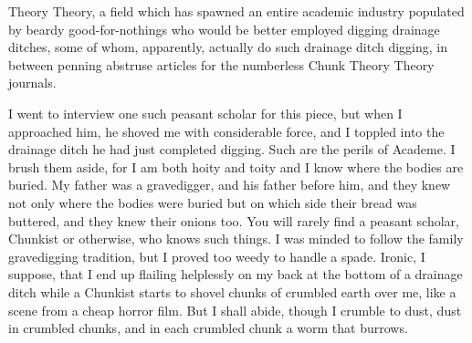 Theory Theory, a field which has spawned an entire academic industry populated by beardy good-for-nothings who would be better employed digging drainage ditches, some of whom, apparently, actually do such drainage ditch digging, in between penning abstruse articles for the numberless Chunk Theory Theory journals.

I went to interview one such peasant scholar for this piece, but when I approached him, he shoved me with considerable force, and I toppled into the drainage ditch he had just completed digging. Such are the perils of Academe. I brush them aside, for I am both hoity and toity and I know where the bodies are buried. My father was a gravedigger, and his father before him, and they knew not only where the bodies were buried but on which side their bread was buttered, and they knew their onions too. You will rarely find a peasant scholar, Chunkist or otherwise, who knows such things. I was minded to follow the family gravedigging tradition, but I proved too weedy to handle a spade. Ironic, I suppose, that I end up flailing helplessly on my back at the bottom of a drainage ditch while a Chunkist starts to shovel chunks of crumbled earth over me, like a scene from a cheap horror film. But I shall abide, though I crumble to dust, dust in crumbled chunks, and in each crumbled chunk a worm that burrows.
